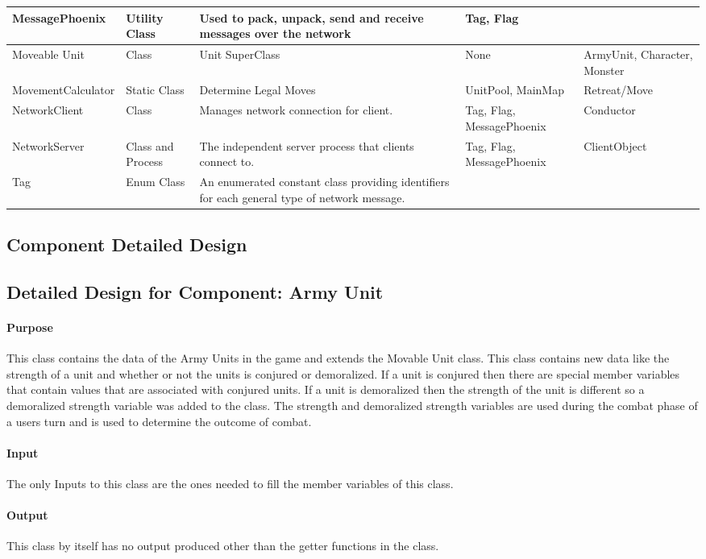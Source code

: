 \documentclass[12pt,a4paper]{article}
\begin{document}
{\begin{center}
\begin{tabularx}{\linewidth}{|l|X|X|X|X|}
\hline
MessagePhoenix & Utility Class & Used to pack, unpack, send and receive messages over the network & Tag, Flag & \\
\hline
Moveable Unit & Class & Unit SuperClass & None & ArmyUnit, Character, Monster\\
\hline
MovementCalculator & Static Class & Determine Legal Moves & UnitPool, MainMap & Retreat/Move\\
\hline
NetworkClient & Class & Manages network connection for client. & Tag, Flag, MessagePhoenix & Conductor \\
\hline
NetworkServer & Class and Process & The independent server process that clients connect to. & Tag, Flag, MessagePhoenix & ClientObject\\
\hline
Tag & Enum Class & An enumerated constant class providing identifiers for each general type of network message. & & \\
\hline
\end{tabularx}
\end{center}
}

\subsection{Component Detailed Design}
\subsection{Detailed Design for Component: Army Unit}
\paragraph{Purpose} This class contains the data of the Army Units in the game and extends the Movable Unit class. This class contains new data like the strength of a unit and whether or not the units is conjured or demoralized. If a unit is conjured then there are special member variables that contain values that are associated with conjured units. If a unit is demoralized then the strength of the unit is different so a demoralized strength variable was added to the class. The strength and demoralized strength variables are used during the combat phase of a users turn and is used to determine the outcome of combat. 
\paragraph{Input} The only Inputs to this class are the ones needed to fill the member variables of this class.
\paragraph{Output} This class by itself has no output produced other than the getter functions in the class.
\end{document}
